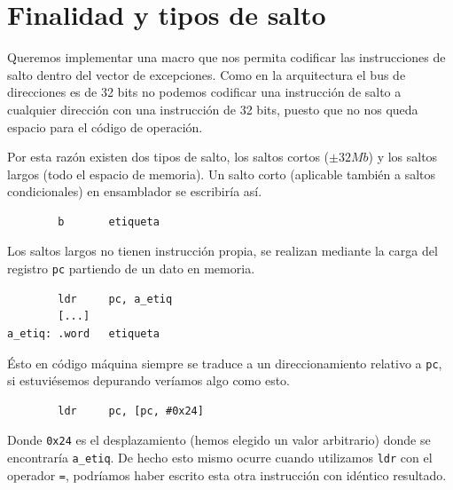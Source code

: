 
\pagestyle{fancy}
\fancyhead[LE,RO]{\thepage}
\fancyhead[LO]{\nouppercase{\rightmark}}

\label{chp:MacroADDEXC}
\minitoc

\section{Finalidad y tipos de salto}

Queremos implementar una macro que nos permita codificar las
instrucciones de salto dentro del vector de excepciones. Como en
la arquitectura el bus de direcciones es de 32 bits no podemos
codificar una instrucción de salto a cualquier dirección con
una instrucción de 32 bits, puesto que no nos queda espacio
para el código de operación.

Por esta razón existen dos tipos de salto, los saltos cortos
($\pm 32Mb$) y los saltos largos (todo el espacio de memoria). Un
salto corto (aplicable también a saltos condicionales) en
ensamblador se escribiría así.

\begin{lstlisting}
        b       etiqueta
\end{lstlisting}

Los saltos largos no tienen instrucción propia, se realizan mediante
la carga del registro {\tt pc} partiendo de un dato en memoria.

\begin{lstlisting}
        ldr     pc, a_etiq
        [...]
a_etiq: .word   etiqueta
\end{lstlisting}

Ésto en código máquina siempre se traduce a un direccionamiento
relativo a {\tt pc}, si estuviésemos depurando veríamos algo como
esto.

\begin{lstlisting}
        ldr     pc, [pc, #0x24]
\end{lstlisting}

Donde {\tt 0x24} es el desplazamiento (hemos elegido un valor arbitrario)
donde se encontraría {\tt a\_etiq}. De hecho esto mismo ocurre cuando utilizamos
{\tt ldr} con el operador {\tt =}, podríamos haber escrito esta otra instrucción
con idéntico resultado.

